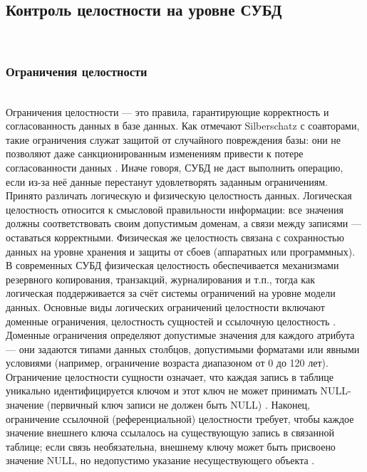\subsection{Контроль целостности на уровне СУБД} ~\\
\subsubsection{Ограничения целостности} ~\\
 Ограничения целостности — это правила, гарантирующие корректность и согласованность данных в базе данных. Как отмечают Silberschatz с соавторами, такие ограничения служат защитой от случайного повреждения базы: они не позволяют даже санкционированным изменениям привести к потере согласованности данных \autocite{Silberschatz}. Иначе говоря, СУБД не даст выполнить операцию, если из-за неё данные перестанут удовлетворять заданным ограничениям. Принято различать логическую и физическую целостность данных. Логическая целостность относится к смысловой правильности информации: все значения должны соответствовать своим допустимым доменам, а связи между записями — оставаться корректными. Физическая же целостность связана с сохранностью данных на уровне хранения и защиты от сбоев (аппаратных или программных). 
 В современных СУБД физическая целостность обеспечивается механизмами резервного копирования, транзакций, журналирования и т.п., тогда как логическая поддерживается за счёт системы ограничений на уровне модели данных. Основные виды логических ограничений целостности включают доменные ограничения, целостность сущностей и ссылочную целостность \autocite{ElmasriNavathe}. Доменные ограничения определяют допустимые значения для каждого атрибута — они задаются типами данных столбцов, допустимыми форматами или явными условиями (например, ограничение возраста диапазоном от 0 до 120 лет). Ограничение целостности сущности означает, что каждая запись в таблице уникально идентифицируется ключом и этот ключ не может принимать NULL-значение (первичный ключ записи не должен быть NULL) \autocite{ElmasriNavathe}. Наконец, ограничение ссылочной (референциальной) целостности требует, чтобы каждое значение внешнего ключа ссылалось на существующую запись в связанной таблице; если связь необязательна, внешнему ключу может быть присвоено значение NULL, но недопустимо указание несуществующего объекта \autocite{ElmasriNavathe}. 

